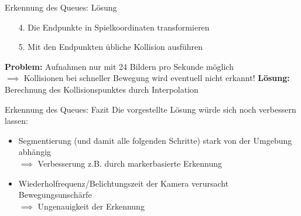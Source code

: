 \begin{frame}{Erkennung des Queues: Lösung}
\begin{itemize}
	\item[4.] Die Endpunkte in Spielkoordinaten transformieren
	\item [5.] Mit den Endpunkten übliche Kollision ausführen	
\end{itemize}
\pause
\textbf{Problem:} Aufnahmen nur mit 24 Bildern pro Sekunde möglich\\
$\implies$ Kollisionen bei schneller Bewegung wird eventuell nicht erkannt!
\pause
\textbf{Lösung:}  Berechnung des Kollisionspunktes durch Interpolation
\begin{center}
\end{center}
\end{frame}
\begin{frame}{Erkennung des Queues: Fazit}
	Die vorgestellte Lösung würde sich noch verbessern lassen:
	\begin{itemize}
		\pause
		\item Segmentierung  (und damit alle folgenden Schritte) stark von der Umgebung abhängig\\
		$\implies$ Verbesserung z.B. durch markerbasierte Erkennung
		\pause
		\item Wiederholfrequenz/Belichtungszeit der Kamera verursacht Bewegungsunschärfe\\
		$\implies$ Ungenauigkeit der Erkennung
	\end{itemize}
\end{frame}


